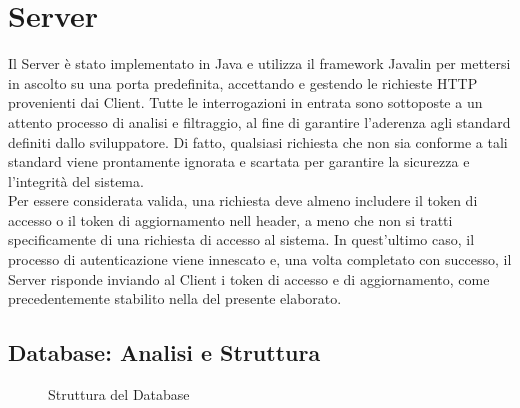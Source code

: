 \section{Server}\label{section1}
Il Server è stato implementato in Java e utilizza il framework Javalin per mettersi in ascolto su una porta predefinita, accettando e gestendo le richieste HTTP provenienti dai Client. Tutte le interrogazioni in entrata sono sottoposte a un attento processo di analisi e filtraggio, al fine di garantire l'aderenza agli standard definiti dallo sviluppatore. Di fatto, qualsiasi richiesta che non sia conforme a tali standard viene prontamente ignorata e scartata per garantire la sicurezza e l'integrità del sistema.\\
Per essere considerata valida, una richiesta deve almeno includere il token di accesso o il token di aggiornamento nell header, a meno che non si tratti specificamente di una richiesta di accesso al sistema. In quest'ultimo caso, il processo di autenticazione viene innescato e, una volta completato con successo, il Server risponde inviando al Client i token di accesso e di aggiornamento, come precedentemente stabilito nella  del presente elaborato.

\subsection{Database: Analisi e Struttura} \label{section2}
\begin{figure}
	\centering
	\caption{Struttura del Database}
	\label{fig:dbdiagram}
\end{figure}

